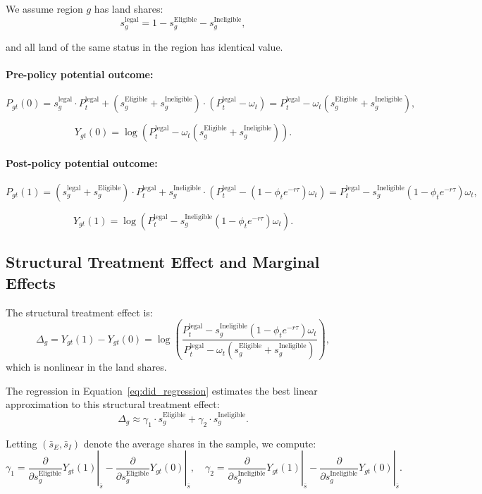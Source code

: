 \documentclass[12pt]{article}
\begin{document}
We assume region $g$ has land shares:
\[
s_g^{\text{legal}} = 1 - s_g^{\text{Eligible}} - s_g^{\text{Ineligible}},
\]

and all land of the same status in the region has identical value.

\paragraph{Pre-policy potential outcome:}

\[
P_{gt}(0) = s_g^{\text{legal}} \cdot P_t^{\text{legal}} + (s_g^{\text{Eligible}} + s_g^{\text{Ineligible}}) \cdot (P_t^{\text{legal}} - \omega_t)
= P_t^{\text{legal}} - \omega_t(s_g^{\text{Eligible}} + s_g^{\text{Ineligible}}),
\]

\[
Y_{gt}(0) = \log \left( P_t^{\text{legal}} - \omega_t(s_g^{\text{Eligible}} + s_g^{\text{Ineligible}}) \right).
\]

\paragraph{Post-policy potential outcome:}

\[
P_{gt}(1) = (s_g^{\text{legal}} + s_g^{\text{Eligible}}) \cdot P_t^{\text{legal}} + s_g^{\text{Ineligible}} \cdot \left(P_t^{\text{legal}} - (1 - \phi_t e^{-r\tau}) \omega_t \right)
= P_t^{\text{legal}} - s_g^{\text{Ineligible}} (1 - \phi_t e^{-r\tau}) \omega_t,
\]

\[
Y_{gt}(1) = \log \left( P_t^{\text{legal}} - s_g^{\text{Ineligible}} (1 - \phi_t e^{-r\tau}) \omega_t \right).
\]

\subsection*{Structural Treatment Effect and Marginal Effects}

The structural treatment effect is:
\[
\Delta_g = Y_{gt}(1) - Y_{gt}(0)
= \log \left( \frac{P_t^{\text{legal}} - s_g^{\text{Ineligible}} (1 - \phi_t e^{-r\tau}) \omega_t}{P_t^{\text{legal}} - \omega_t (s_g^{\text{Eligible}} + s_g^{\text{Ineligible}})} \right),
\]
which is nonlinear in the land shares.

The regression in Equation~\eqref{eq:did_regression} estimates the best linear approximation to this structural treatment effect:
\[
\Delta_g \approx \gamma_1 \cdot s_g^{\text{Eligible}} + \gamma_2 \cdot s_g^{\text{Ineligible}}.
\]

Letting $(\bar{s}_E, \bar{s}_I)$ denote the average shares in the sample, we compute:
\[
\gamma_1 = \left. \frac{\partial}{\partial s_g^{\text{Eligible}}} Y_{gt}(1) \right|_{\bar{s}} - \left. \frac{\partial}{\partial s_g^{\text{Eligible}}} Y_{gt}(0) \right|_{\bar{s}},
\quad
\gamma_2 = \left. \frac{\partial}{\partial s_g^{\text{Ineligible}}} Y_{gt}(1) \right|_{\bar{s}} - \left. \frac{\partial}{\partial s_g^{\text{Ineligible}}} Y_{gt}(0) \right|_{\bar{s}}.
\]
\end{document}
